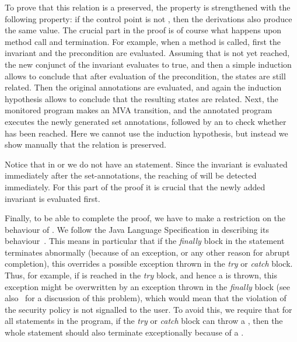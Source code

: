 To prove that this relation is a preserved, the property is
strengthened with the following property: if the control point is not
\halted, then the derivations also produce the same value. The crucial
part in the proof is of course what happens upon method call and
termination. For example, when a method is called, first the invariant
and the precondition are evaluated. Assuming that \halted is not yet
reached, the new conjunct of the invariant evaluates to true, and then
a simple induction allows to conclude that after evaluation of the
precondition, the states are still related. Then the original \preset
annotations are evaluated, and again the induction hypothesis allows to
conclude that the resulting states are related. Next, the monitored
program makes an MVA transition, and the annotated program executes
the newly generated set annotations, followed by an \Assert to check
whether \halted has been reached. Here we cannot use the induction
hypothesis, but instead we show manually that the relation is
preserved.

Notice that in \postset or \excset we do not have an \Assert
statement. Since the invariant is evaluated immediately after the
set-annotations, the reaching of \halted will be detected
immediately. For this part of the proof it is crucial that
the newly added invariant is evaluated first.

Finally, to be able to complete the proof, we have to make a
restriction on the behaviour of \TryCatch. We follow the Java Language
Specification in describing its behaviour~\cite{GoslingJSB05}. This
means in particular that if the \emph{finally} block in the statement
terminates abnormally (because of an exception, or any other reason
for abrupt completion), this overrides a possible exception thrown in
the \emph{try} or \emph{catch} block. Thus, for example, if \halted
is reached in the \emph{try} block, and hence a \JMLExc is thrown, this
exception might be overwritten by an exception thrown in the
\emph{finally} block (see also~\cite{Huisman08} for a discussion of
this problem), which would mean that the violation of the security
policy is not signalled to the user. To avoid this, we require that
for all \TryCatch statements in the program, if the \emph{try} or
\emph{catch} block can throw a \JMLExc, then the whole statement
should also terminate exceptionally because of a \JMLExc.


